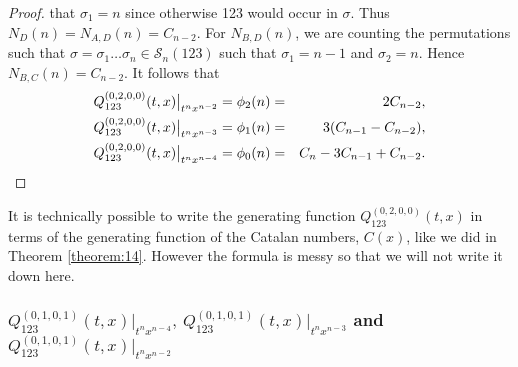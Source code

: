 \documentclass[
final,nomarks
]{dmtcs-episciences}
\newcommand{\tref}[1]{Theorem \ref{theorem:#1}}
\newcommand{\Sn}[1]{\mathcal{S}_{#1}}
\newcommand{\Qm}[1]{Q_{123}^{(#1)}(t,x)}
\begin{document}
\begin{proof}
	that \begin{math}\sigma_1 =n\end{math} since otherwise 123 would occur in \begin{math}\sigma\end{math}. Thus \begin{math}N_{D}(n)=N_{A,D}(n)=C_{n-2}\end{math}.
	For \begin{math}N_{B,D}(n)\end{math}, we are counting the permutations 
	such that \begin{math}\sigma = \sigma_1 \ldots \sigma_n \in \Sn{n}(123)\end{math} such that \begin{math}\sigma_{1} = n-1\end{math} and \begin{math}\sigma_2 =n\end{math}.  
	Hence  \begin{math}N_{B,C}(n) =C_{n-2}\end{math}. It follows that  
	\begin{eqnarray}
		\Qm{0,2,0,0}\big|_{t^n x^{n-2}}=\phi_2(n)&=&2C_{n-2},\\
		\Qm{0,2,0,0}\big|_{t^n x^{n-3}}=\phi_1(n)&=&3(C_{n-1}-C_{n-2}),\\
		\Qm{0,2,0,0}\big|_{t^n x^{n-4}}=\phi_0(n)&=&C_n-3C_{n-1}+C_{n-2}. \qedhere
	\end{eqnarray}
\end{proof}
It is technically possible to write the generating function \begin{math}\Qm{0,2,0,0}\end{math} in terms of the generating function of the Catalan numbers, \begin{math}C(x)\end{math}, like we did in \tref{14}. However the formula is messy so that 
we will not write it down here. 

\subsubsection{\(\Qm{0,1,0,1}\big|_{t^n x^{n-4}},\ \Qm{0,1,0,1}\big|_{t^n x^{n-3}}\) and \(\Qm{0,1,0,1}\big|_{t^n x^{n-2}}\)}
\end{document}
